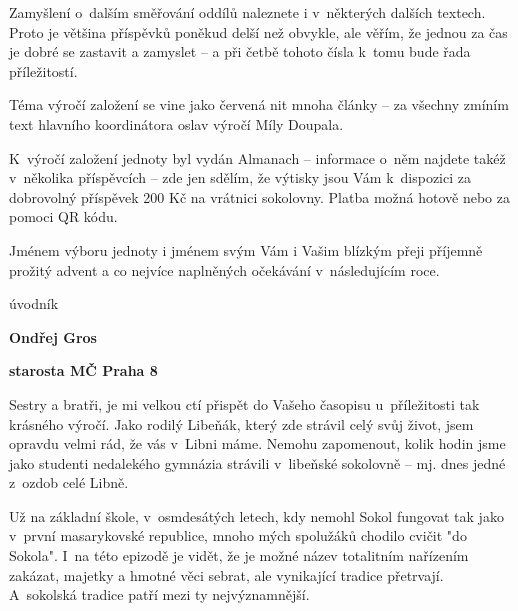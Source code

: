 \documentclass[11pt]{article}
\begin{document}
Zamyšlení o~dalším směřování oddílů naleznete i v~některých dalších textech. Proto je většina příspěvků poněkud delší než obvykle, ale věřím, že jednou za čas je dobré se zastavit a zamyslet – a při četbě tohoto čísla k~tomu bude řada příležitostí. 

Téma výročí založení se vine jako červená nit mnoha články – za všechny zmíním text hlavního koordinátora oslav výročí Míly Doupala. 

K~výročí založení jednoty byl vydán Almanach – informace o~něm najdete takéž v~několika příspěvcích – zde jen sdělím, že výtisky jsou Vám k~dispozici za dobrovolný příspěvek 200 Kč na vrátnici sokolovny. Platba možná hotově nebo za pomoci QR kódu. 

Jménem výboru jednoty i jménem svým Vám i Vašim blízkým přeji příjemně prožitý advent a co nejvíce naplněných očekávání v~následujícím roce.



\clearpage

\pagestyle{uvodnik}


\begin{multicols}{2}
  {\fontsize{48pt}{57pt} \fugner \color{sokolred} \noindent úvodník}
 
  \columnbreak

  \vspace*{-4pt}
 
  {\hfill\textbf{Ondřej Gros}}
  
  {\hfill\textbf{starosta MČ Praha 8}}
 \end{multicols}

\vspace*{12pt}

\noindent
Sestry a bratři, 
\noindent
je mi velkou ctí přispět do Vašeho časopisu u~příležitosti tak krásného výročí. Jako rodilý Libeňák, který zde strávil celý svůj život, jsem opravdu velmi rád, že vás v~Libni máme. Nemohu zapomenout, kolik hodin jsme jako studenti nedalekého gymnázia strávili v~libeňské sokolovně – mj. dnes jedné z~ozdob celé Libně.

Už na základní škole, v~osmdesátých letech, kdy nemohl Sokol fungovat tak jako v~první masarykovské republice, mnoho mých spolužáků chodilo cvičit "do Sokola". I~na této epizodě je vidět, že je možné název totalitním nařízením zakázat, majetky a hmotné věci sebrat, ale vynikající tradice přetrvají. A~sokolská tradice patří mezi ty nejvýznamnější.
\end{document}

